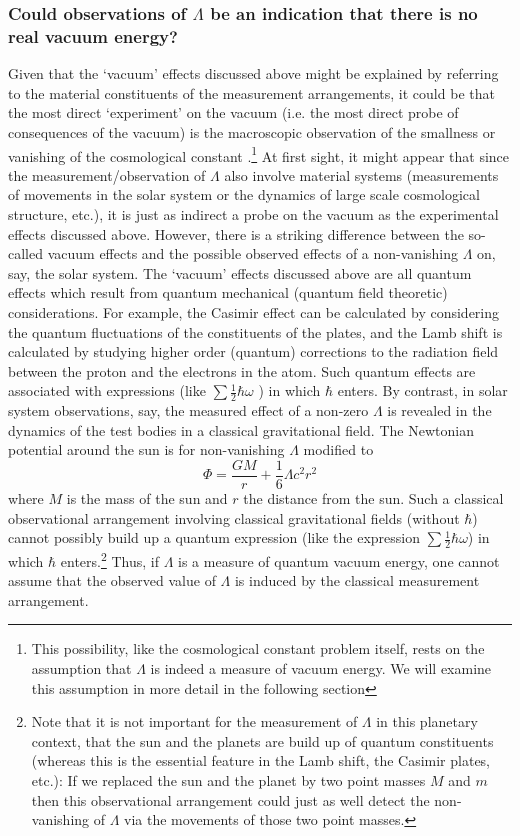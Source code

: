 \documentclass[12pt]{article}
\newcommand{\beq}{\begin{equation}}
\newcommand{\eeq}{\end{equation}}
\def\sss{\subsubsection}
\begin{document}
\sss{Could observations of $\Lambda$ be an indication that there
is no real vacuum energy?}

Given that the `vacuum' effects discussed above might be explained
by referring to the material constituents of the measurement
arrangements, it could be that the most direct `experiment' on the
vacuum (i.e. the most direct probe of consequences of the vacuum)
is the macroscopic observation of the smallness or vanishing of
the cosmological constant \cite{rugh96}.\footnote{This
possibility, like the cosmological constant problem itself, rests
on the assumption that $\Lambda$ is indeed a measure of vacuum
energy. We will examine this assumption in more detail in the
following section} At first sight, it might appear that since the
measurement/observation of $\Lambda$ also involve material systems
(measurements of movements in the solar system or the dynamics of
large scale cosmological structure, etc.), it is just as indirect
a probe on the vacuum as the experimental effects discussed above.
However, there is a striking difference between the so-called
vacuum effects and the possible observed effects of a
non-vanishing $\Lambda$ on, say, the solar system. The `vacuum'
effects discussed above are all quantum effects which result from
quantum mechanical (quantum field theoretic) considerations. For
example, the Casimir effect can be calculated by considering the
quantum fluctuations of the constituents of the plates, and the
Lamb shift is calculated by studying higher order (quantum)
corrections to the radiation field between the proton and the
electrons in the atom. Such quantum effects are associated with
expressions (like $\sum \frac{1}{2} \hbar \omega$ ) in which
$\hbar$ enters. By contrast, in solar system observations, say,
the measured effect of a non-zero $\Lambda$ is revealed in the
dynamics of the test bodies in a classical gravitational field.
The Newtonian potential around the sun is for non-vanishing
$\Lambda$ modified to \cite{gibbons77,axenides00} 
\beq 
\Phi=\frac{GM}{r}+ \frac{1}{6}
\Lambda c^2 r^2 
\eeq 
where $M$ is the mass of the sun and $r$ the
distance from the sun. Such a classical observational arrangement
involving classical gravitational fields (without $\hbar$) cannot
possibly build up a quantum expression (like the expression $\sum
\frac{1}{2}\hbar \omega$) in which $\hbar$ enters.\footnote{Note
that it is not important for the measurement of $\Lambda$ in this
planetary context, that the sun and the planets are build up of
quantum constituents (whereas this is the essential feature in the
Lamb shift, the Casimir plates, etc.): If we replaced the sun and
the planet by two point masses $M$ and $m$ then this observational
arrangement could just as well detect the non-vanishing of
$\Lambda$ via the movements of those two point masses.} Thus, if
$\Lambda$ is a measure of quantum vacuum energy, one cannot assume
that the observed value of $\Lambda$ is induced by the
classical measurement arrangement.
\end{document}
